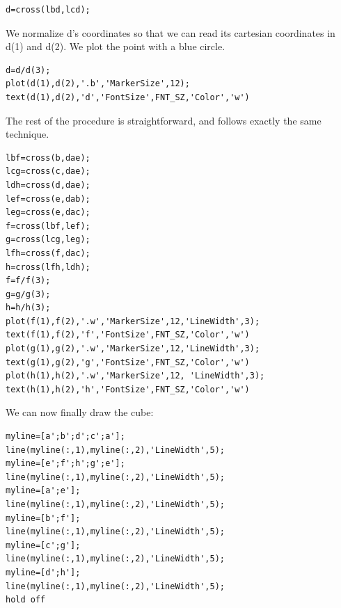 \documentclass[12pt, a4paper]{report}
\newtheorem[style=M,bodystyle=\normalfont]{theorem}{Theorem}
\newtheorem[style=M,bodystyle=\normalfont]{corollary}{Corollary}
\newtheorem[style=M,bodystyle=\normalfont]{lemma}{Lemma}
\newtheorem[style=M,bodystyle=\normalfont]{definition}{Definition}
\begin{document}
\begin{Answer}[ref=2]
\begin{lstlisting}[frame=single, numbers=none, style=Matlab-bw]
d=cross(lbd,lcd);
        \end{lstlisting}
        We normalize d's coordinates so that we can read its cartesian coordinates in d(1) and d(2). We plot the point with a blue circle.
        \begin{lstlisting}[frame=single, numbers=none, style=Matlab-bw]
d=d/d(3);
plot(d(1),d(2),'.b','MarkerSize',12);
text(d(1),d(2),'d','FontSize',FNT_SZ,'Color','w')
        \end{lstlisting}
        The rest of the procedure is straightforward, and follows exactly the same technique.
        \begin{lstlisting}[frame=single, numbers=none, style=Matlab-bw]
lbf=cross(b,dae);
lcg=cross(c,dae);
ldh=cross(d,dae);
lef=cross(e,dab);
leg=cross(e,dac);
f=cross(lbf,lef);
g=cross(lcg,leg);
lfh=cross(f,dac);
h=cross(lfh,ldh);
f=f/f(3);
g=g/g(3);
h=h/h(3);
plot(f(1),f(2),'.w','MarkerSize',12,'LineWidth',3); 
text(f(1),f(2),'f','FontSize',FNT_SZ,'Color','w')
plot(g(1),g(2),'.w','MarkerSize',12,'LineWidth',3); 
text(g(1),g(2),'g','FontSize',FNT_SZ,'Color','w')
plot(h(1),h(2),'.w','MarkerSize',12, 'LineWidth',3);
text(h(1),h(2),'h','FontSize',FNT_SZ,'Color','w')
        \end{lstlisting}
        We can now finally draw the cube: 
        \begin{lstlisting}[frame=single, numbers=none, style=Matlab-bw]
myline=[a';b';d';c';a'];
line(myline(:,1),myline(:,2),'LineWidth',5);
myline=[e';f';h';g';e'];
line(myline(:,1),myline(:,2),'LineWidth',5);
myline=[a';e'];
line(myline(:,1),myline(:,2),'LineWidth',5);
myline=[b';f'];
line(myline(:,1),myline(:,2),'LineWidth',5);
myline=[c';g'];
line(myline(:,1),myline(:,2),'LineWidth',5);
myline=[d';h'];
line(myline(:,1),myline(:,2),'LineWidth',5);
hold off
        \end{lstlisting}
    \end{Answer}
\end{document}
